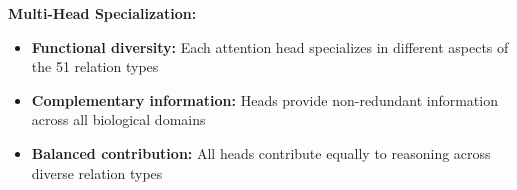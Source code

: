 \textbf{Multi-Head Specialization:}
\begin{itemize}
\item \textbf{Functional diversity:} Each attention head specializes in different aspects of the 51 relation types
\item \textbf{Complementary information:} Heads provide non-redundant information across all biological domains
\item \textbf{Balanced contribution:} All heads contribute equally to reasoning across diverse relation types
\end{itemize}